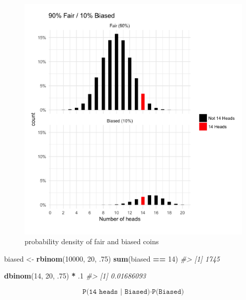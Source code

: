 \documentclass[]{article}
\newenvironment{Shaded}{\begin{snugshade}}{\end{snugshade}}
\newcommand{\CommentTok}[1]{\textcolor[rgb]{0.56,0.35,0.01}{\textit{#1}}}
\newcommand{\DecValTok}[1]{\textcolor[rgb]{0.00,0.00,0.81}{#1}}
\newcommand{\FloatTok}[1]{\textcolor[rgb]{0.00,0.00,0.81}{#1}}
\newcommand{\KeywordTok}[1]{\textcolor[rgb]{0.13,0.29,0.53}{\textbf{#1}}}
\newcommand{\NormalTok}[1]{#1}
\newcommand{\OperatorTok}[1]{\textcolor[rgb]{0.81,0.36,0.00}{\textbf{#1}}}
\newcommand{\StringTok}[1]{\textcolor[rgb]{0.31,0.60,0.02}{#1}}
\begin{document}
\begin{figure}
\centering
\includegraphics{image-lib/prob_densities_of_fair_and_biased_coins.png}
\caption{probability density of fair and biased coins}
\end{figure}

\begin{Shaded}
\begin{Highlighting}[]
\NormalTok{biased <-}\StringTok{ }\KeywordTok{rbinom}\NormalTok{(}\DecValTok{10000}\NormalTok{, }\DecValTok{20}\NormalTok{, }\FloatTok{.75}\NormalTok{)}
\KeywordTok{sum}\NormalTok{(biased }\OperatorTok{==}\StringTok{ }\DecValTok{14}\NormalTok{)}
\CommentTok{#> [1] 1745}
\end{Highlighting}
\end{Shaded}

\begin{Shaded}
\begin{Highlighting}[]
\KeywordTok{dbinom}\NormalTok{(}\DecValTok{14}\NormalTok{, }\DecValTok{20}\NormalTok{, }\FloatTok{.75}\NormalTok{) }\OperatorTok{*}\StringTok{ }\FloatTok{.1}
\CommentTok{#> [1] 0.01686093}
\end{Highlighting}
\end{Shaded}

\[\texttt{P(14 heads | Biased)} \cdot \texttt{P(Biased)}\]
\end{document}
